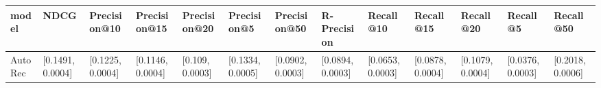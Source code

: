 \begin{tabular}{lllllllllllll}
\toprule
   model &              NDCG &      Precision@10 &      Precision@15 &     Precision@20 &       Precision@5 &      Precision@50 &       R-Precision &         Recall@10 &         Recall@15 &         Recall@20 &          Recall@5 &         Recall@50 \\
\midrule
 AutoRec &  [0.1491, 0.0004] &  [0.1225, 0.0004] &  [0.1146, 0.0004] &  [0.109, 0.0003] &  [0.1334, 0.0005] &  [0.0902, 0.0003] &  [0.0894, 0.0003] &  [0.0653, 0.0003] &  [0.0878, 0.0004] &  [0.1079, 0.0004] &  [0.0376, 0.0003] &  [0.2018, 0.0006] \\
\bottomrule
\end{tabular}

